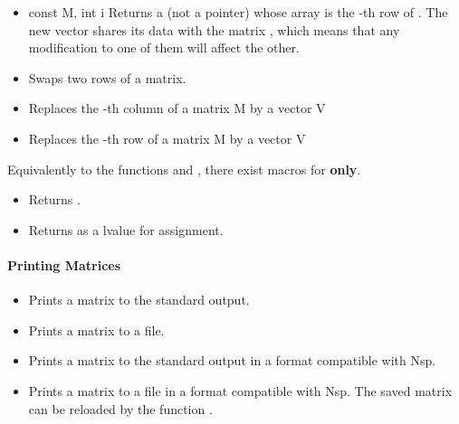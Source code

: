 \begin{itemize}
\item {}
  {const  \ptr M, int i}
  \sshortdescribe Returns a  (not a pointer) whose array is
  the -th row of . The new vector shares its data with the
  matrix , which means that any modification to one of them will affect
  the other.
  
\item {}
  \sshortdescribe Swaps two rows of a matrix.  

\item {}
  \sshortdescribe Replaces the -th column of a matrix M by a vector V 

\item {}
  \sshortdescribe Replaces the -th row of a matrix M by a vector V  
\end{itemize}

Equivalently to the functions  and ,
there exist macros for {\bf {} only}.
\begin{itemize}
\item {}
  \sshortdescribe Returns .
  
\item {}
  \sshortdescribe Returns  as a lvalue for assignment.
\end{itemize}


\paragraph{Printing Matrices}

\begin{itemize}
\item {}
  \sshortdescribe Prints a matrix to the standard output.  

\item {}
  \sshortdescribe Prints a matrix to a file.

\item {}
  \sshortdescribe Prints a matrix to the standard output in a format
  compatible with Nsp.  

\item {}
  \sshortdescribe Prints a matrix to a file in a format compatible with Nsp. The
  saved matrix can be reloaded by the function
  .
\end{itemize}


